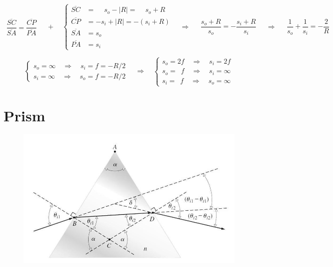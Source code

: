 \begin{equation*}
  \begin{aligned}
    \dfrac{\overline{SC}}{\overline{SA}} = \dfrac{\overline{CP}}{\overline{PA}}  
  \end{aligned}
  \quad + \quad
  \left\{
  \begin{aligned}
    \overline{SC} &= \phantom{-} s_o - \left| R \right| = \phantom{-(} s_o + R \phantom{)} \\ 
    \overline{CP} &= - s_i + \left| R \right| = -  \left( s_i + R \right) \\
    \overline{SA} &= s_o \\
    \overline{PA} &= s_i
  \end{aligned}
  \right.
  \quad \Rightarrow \quad
  \begin{aligned}
    \dfrac{s_o + R}{s_o} = - \dfrac{s_i + R}{s_i}  
  \end{aligned}
  \quad \Rightarrow \quad
  \begin{aligned}
    \dfrac{1}{s_o} + \dfrac{1}{s_i} = - \dfrac{2}{R}   
  \end{aligned}
\end{equation*}

\begin{equation*}
  \left\{
  \begin{aligned}
    s_o = \infty \quad \Rightarrow \quad s_i = f = - R / 2 \\
    s_i = \infty \quad \Rightarrow \quad s_o = f = - R / 2 
  \end{aligned}
  \right.
  \quad \Rightarrow \quad 
  \left\{
  \begin{aligned}
    s_o = 2f \quad \Rightarrow \quad s_i = 2f \\
    s_o = \phantom{1} f \quad \Rightarrow \quad s_i = \infty \\
    s_i = \phantom{1} f \quad \Rightarrow \quad s_o = \infty
  \end{aligned}
  \right.
\end{equation*}

\section{Prism}

\begin{figure}[H]
  \centering
  \includegraphics[width=0.5\linewidth]{figures/Prism}
\end{figure}


